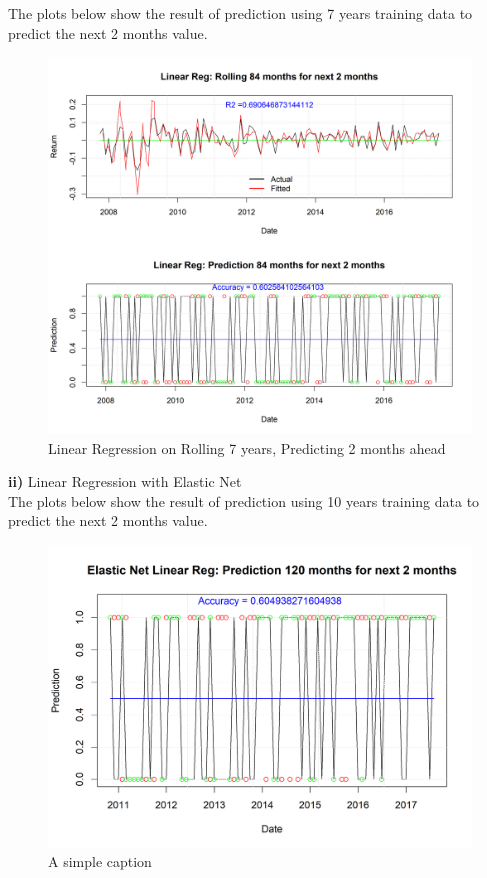 \documentclass[12pt]{amsart}
\begin{document}
The plots below show the result of prediction using 7 years training data to predict the next 2 months value.
\begin{figure}[htb]
	\includegraphics[width=170mm]{IYW_linear_reg_rolling}
	\caption{Linear Regression on Rolling 7 years, Predicting 2 months ahead \label{overflow}}
\end{figure}

\newpage

\textbf{ii)} Linear Regression with Elastic Net\\

The plots below show the result of prediction using 10 years training data to predict the next 2 months value.
\begin{figure}[htb]
	\includegraphics[width=170mm]{IYW_linear_elastic_rolling}
	\caption{A simple caption \label{overflow}}
\end{figure}
\end{document}
